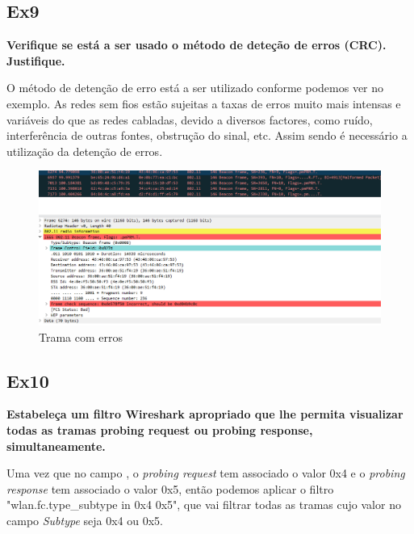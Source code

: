 \documentclass{article}
\begin{document}
\subsection{Ex9}
\textbf{Verifique se está a ser usado o método de deteção de erros (CRC). Justifique.}\\\par
O método de detenção de erro está a ser utilizado conforme podemos ver no exemplo.
As redes sem fios estão sujeitas a taxas de erros muito mais intensas e variáveis do que as redes cabladas, devido a diversos factores, como ruído, interferência de outras fontes, obstrução do sinal, etc. Assim sendo é necessário a utilização da detenção de erros. 
\begin{figure}[h]
	\centering
	\includegraphics[scale = 0.5]{ex9TP4.PNG}
	\caption{Trama com erros}
\end{figure}

\subsection{Ex10}
\textbf{Estabeleça um filtro Wireshark apropriado que lhe permita visualizar todas as tramas probing request ou probing response, simultaneamente.}\\\par
Uma vez que no campo , o \textit{probing request} tem associado o valor 0x4 e o \textit{probing response} tem associado o valor 0x5, então podemos aplicar o filtro "wlan.fc.type\_subtype in {0x4 0x5}", que vai filtrar todas as tramas cujo valor no campo \textit{Subtype} seja 0x4 ou 0x5.

\newpage
\end{document}
